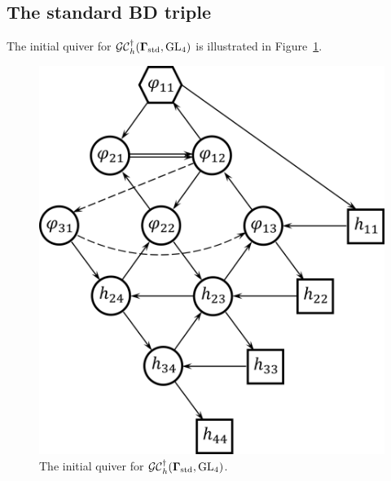 \subsection{The standard BD triple}
The initial quiver for $\mathcal{GC}_h^{\dagger}(\mathbf{\Gamma}_{\text{std}},\operatorname{GL}_4)$ is illustrated in Figure~\ref{f:h_n=4_std}.

\begin{figure}[htb]
\begin{center}
\includegraphics[scale=0.65]{h_convention/h_n=4_std.png}
\end{center}
\caption{The initial quiver for $\mathcal{GC}^{\dagger}_h(\mathbf{\Gamma}_{\text{std}},\operatorname{GL}_4)$.}
\label{f:h_n=4_std}
\end{figure}

